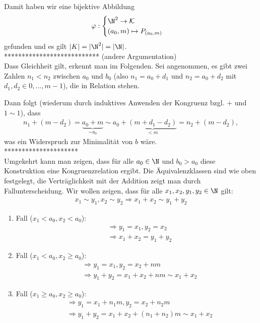 \begin{solution}
\begin{itemize}
Damit haben wir eine bijektive Abbildung
\begin{align*}
  \varphi: \begin{cases}
    \N^2 \rightarrow \mathcal{K} \\
    (a_0,m) \mapsto P_{(a_0,m)}
  \end{cases}
\end{align*}
gefunden und es gilt $|K| = |\N^2| = |\N|$. \\
*************************** (andere Argumentation) \\
Dass Gleichheit gilt, erkennt man im Folgenden. Sei angenommen, es gibt zwei Zahlen $n_1 < n_2$ zwischen $a_0$ und $b_0$ (also $n_1 = a_0 + d_1$ und $n_2 = a_0 + d_2$ mit $d_1,d_2 \in {0,...,m-1}$), die in Relation stehen.

Dann folgt (wiederum durch induktives Anwenden der Kongruenz bzgl. $+$ und $1 \sim 1$), dass
\begin{align*}
n_1 + (m-d_2) = \underbrace{a_0 + m}_{\sim a_0} \sim a_0 + \underbrace{(m + d_1 - d_2)}_{<m} = n_2 + (m-d_2),
\end{align*}
was ein Widerspruch zur Minimalität von $b$ wäre.\\
********************* \\
Umgekehrt kann man zeigen, dass für alle $a_0 \in \N$ und $b_0 > a_0$ diese Konstruktion eine Kongruenzrelation ergibt. Die Äquivalenzklassen sind wie oben festgelegt, die Verträglichkeit mit der Addition zeigt man durch Fallunterscheidung.
Wir wollen zeigen, dass für alle $x_1,x_2,y_1,y_2 \in \N$ gilt:
\begin{align*}
  x_1 \sim y_1,x_2 \sim y_2 \Rightarrow x_1 + x_2 \sim y_1 + y_2
\end{align*}

\begin{enumerate}[label = \textit{\arabic*.}]
\item Fall ($x_1 < a_0, x_2 < a_0$):
\begin{align*}
  &\Rightarrow y_1 = x_1, y_2 = x_2 \\
  &\Rightarrow x_1 + x_2 = y_1 + y_2
\end{align*}
\item Fall ($x_1 < a_0, x_2 \geq a_0$):
\begin{align*}
  &\Rightarrow y_1 = x_1, y_2 = x_2 + nm \\
  &\Rightarrow  y_1 + y_2 = x_1 + x_2 + nm \sim x_1 + x_2
\end{align*}
\item Fall ($x_1 \geq a_0, x_2 \geq a_0$):
\begin{align*}
  &\Rightarrow y_1 = x_1 + n_1 m, y_2 = x_2 + n_2 m \\
  &\Rightarrow  y_1 + y_2 = x_1 + x_2 + (n_1+n_2) m \sim x_1 + x_2
\end{align*}
\end{enumerate}


\end{itemize}
\end{solution}
